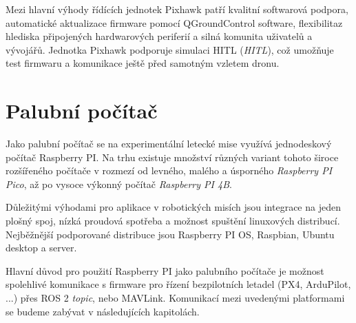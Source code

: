 Mezi hlavní výhody řídících jednotek Pixhawk patří kvalitní softwarová podpora, automatické aktualizace firmware pomocí QGroundControl software, flexibilita\break z hlediska připojených hardwarových periferií a silná komunita uživatelů a vývojářů. Jednotka Pixhawk podporuje simulaci \acs{HITL} (\textit{\acl{HITL}}), což umožňuje test firmwaru a komunikace ještě před samotným vzletem dronu.

\section{Palubní počítač}

Jako palubní počítač se na experimentální letecké mise využívá jednodeskový počítač Raspberry PI. Na trhu existuje množství různých variant tohoto široce rozšířeného počítače v rozmezí od levného, malého a úsporného  \textit{Raspberry PI Pico}, až po vysoce výkonný počítač \textit{Raspberry PI 4B}.

Důležitými výhodami pro aplikace v robotických misích jsou integrace na jeden plošný spoj, nízká proudová spotřeba a možnost spuštění linuxových distribucí. Nejběžnější podporované distribuce jsou Raspberry PI OS, Raspbian, Ubuntu desktop a server.

Hlavní důvod pro použití Raspberry PI jako palubního počítače je možnost spolehlivé komunikace s firmware pro řízení bezpilotních letadel (PX4, ArduPilot, ...) přes ROS 2 \textit{topic}, nebo MAVLink. Komunikací mezi uvedenými platformami se budeme zabývat v následujících kapitolách.

